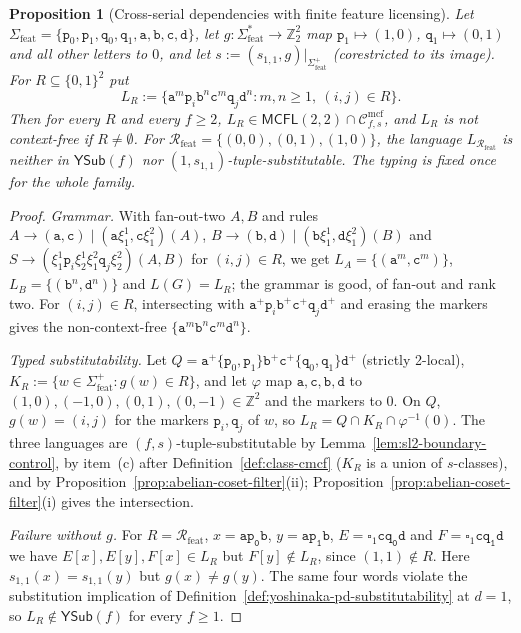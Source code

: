 \documentclass[11pt]{article}
\numberwithin{equation}{section}
\theoremstyle{plain}
\newtheorem{proposition}[theorem]{Proposition}
\theoremstyle{definition}
\theoremstyle{remark}
\newcommand{\Cmcf}[2]{\mathcal{C}^{\mathrm{mcf}}_{#1,#2}}
\newcommand{\blank}{\square}
\newcommand{\YSub}[1]{\mathsf{YSub}(#1)}
\begin{document}
\begin{proposition}[Cross-serial dependencies with finite feature licensing]
\label{prop:feature-cross-typed}
Let $\Sigma_{\mathrm{feat}}=\{\mathtt p_0,\mathtt p_1,\mathtt q_0,\mathtt q_1,
\mathtt a,\mathtt b,\mathtt c,\mathtt d\}$, let $g:\Sigma_{\mathrm{feat}}^*\to\mathbb Z_2^2$
map $\mathtt p_1\mapsto(1,0)$, $\mathtt q_1\mapsto(0,1)$ and all other letters to $0$, and
let $s:=(s_{1,1},g)|_{\Sigma_{\mathrm{feat}}^+}$ (corestricted to its image).  For
$R\subseteq\{0,1\}^2$ put
\[
 L_R:=\{\mathtt a^m\mathtt p_i\mathtt b^n\mathtt c^m\mathtt q_j\mathtt d^n:
 m,n\ge1,\ (i,j)\in R\}.
\]
Then for every $R$ and every $f\ge2$, $L_R\in\mathsf{MCFL}(2,2)\cap\Cmcf{f}{s}$, and
$L_R$ is not context-free if $R\ne\emptyset$.  For
$\mathcal R_{\mathrm{feat}}=\{(0,0),(0,1),(1,0)\}$, the language
$L_{\mathcal R_{\mathrm{feat}}}$ is neither in $\YSub{f}$ nor
$(1,s_{1,1})$-tuple-substitutable.  The typing is fixed once for the whole
family.
\end{proposition}

\begin{proof}
\emph{Grammar.}  With fan-out-two $A,B$ and rules
$A\to(\mathtt a,\mathtt c)\mid(\mathtt a\xi_1^1,\mathtt c\xi_1^2)(A)$,
$B\to(\mathtt b,\mathtt d)\mid(\mathtt b\xi_1^1,\mathtt d\xi_1^2)(B)$ and
$S\to(\xi_1^1\mathtt p_i\xi_2^1\xi_1^2\mathtt q_j\xi_2^2)(A,B)$ for
$(i,j)\in R$, we get $L_A=\{(\mathtt a^m,\mathtt c^m)\}$,
$L_B=\{(\mathtt b^n,\mathtt d^n)\}$ and $L(G)=L_R$; the grammar is good,
of fan-out and rank two.  For $(i,j)\in R$, intersecting with
$\mathtt a^+\mathtt p_i\mathtt b^+\mathtt c^+\mathtt q_j\mathtt d^+$ and erasing the
markers gives the non-context-free $\{\mathtt a^m\mathtt b^n\mathtt c^m\mathtt d^n\}$.

\emph{Typed substitutability.}  Let
$Q=\mathtt a^+\{\mathtt p_0,\mathtt p_1\}\mathtt b^+\mathtt c^+\{\mathtt q_0,\mathtt q_1\}
\mathtt d^+$ (strictly 2-local), $K_R:=\{w\in\Sigma_{\mathrm{feat}}^+:g(w)\in R\}$, and let
$\varphi$ map $\mathtt a,\mathtt c,\mathtt b,\mathtt d$ to
$(1,0),(-1,0),(0,1),(0,-1)\in\mathbb Z^2$ and the markers to $0$.  On $Q$,
$g(w)=(i,j)$ for the markers $\mathtt p_i,\mathtt q_j$ of $w$, so
$L_R=Q\cap K_R\cap\varphi^{-1}(0)$.  The three languages are
$(f,s)$-tuple-substitutable by Lemma~\ref{lem:sl2-boundary-control}, by item~(c)
after Definition~\ref{def:class-cmcf} ($K_R$ is a union of $s$-classes), and by
Proposition~\ref{prop:abelian-coset-filter}(ii);
Proposition~\ref{prop:abelian-coset-filter}(i) gives the intersection.

\emph{Failure without $g$.}  For $R=\mathcal R_{\mathrm{feat}}$, $x=\mathtt{ap_0b}$,
$y=\mathtt{ap_1b}$, $E=\blank_1\mathtt{cq_0d}$ and $F=\blank_1\mathtt{cq_1d}$ we have
$E[x],E[y],F[x]\in L_R$ but $F[y]\notin L_R$, since $(1,1)\notin R$.  Here
$s_{1,1}(x)=s_{1,1}(y)$ but $g(x)\ne g(y)$.  The same four words violate the
substitution implication of Definition~\ref{def:yoshinaka-pd-substitutability} at
$d=1$, so $L_R\notin\YSub{f}$ for every $f\ge1$.
\end{proof}
\end{document}
